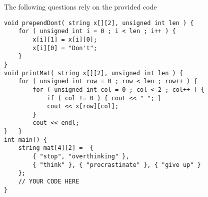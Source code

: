 \documentclass[addpoints,12pt]{exam}
\newcommand{\Soln}[1]{{\color{red}{SOLUTION: #1}}}%
\begin{document}
\begin{questions}
 The following questions rely on the provided code
\begin{verbatim}
void prependDont( string x[][2], unsigned int len ) {
    for ( unsigned int i = 0 ; i < len ; i++ ) {
        x[i][1] = x[i][0];
        x[i][0] = "Don't";
    }
}
void printMat( string x[][2], unsigned int len ) {
    for ( unsigned int row = 0 ; row < len ; row++ ) {
        for ( unsigned int col = 0 ; col < 2 ; col++ ) {
            if ( col != 0 ) { cout << " "; }
            cout << x[row][col];
        }
        cout << endl;
}   }
int main() {
    string mat[4][2] =  {
        { "stop", "overthinking" },
        { "think" }, { "procrastinate" }, { "give up" }
    };
    // YOUR CODE HERE
}
\end{verbatim}

\end{questions}
\end{document}
